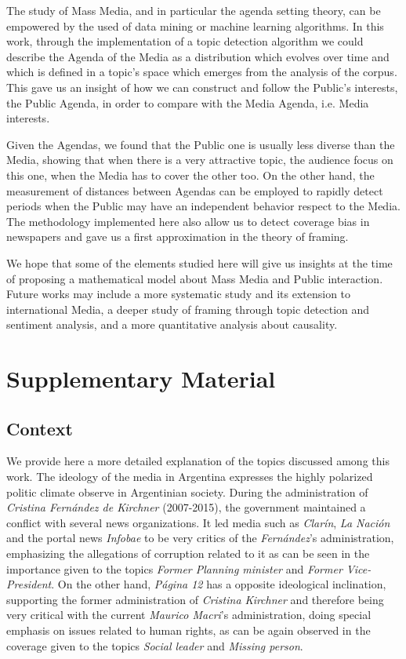 \documentclass{bmcart}
\begin{document}
\par The study of Mass Media, and in particular the agenda setting theory, can be empowered by the used of data mining or machine learning algorithms. 
In this work, through the implementation of a topic detection algorithm we could describe the Agenda of the Media as a distribution which evolves over time and which is defined in a topic's space which emerges from the analysis of the corpus.
This gave us an insight of how we can construct and follow the Public's interests, the Public Agenda, in order to compare with the Media Agenda, i.e. Media interests. 
\par Given the Agendas, we found that the Public one is usually less diverse than the Media, showing that when there is a very attractive topic, the audience focus on this one, when the Media has to cover the other too. 
On the other hand, the measurement of distances between Agendas can be employed to rapidly detect periods when the Public may have an independent behavior respect to the Media. The methodology implemented here also allow us to detect coverage bias in newspapers and gave us a first approximation in the theory of framing. 
\par We hope that some of the elements studied here will give us insights at the time of proposing a mathematical model about Mass Media and Public interaction. Future works may include a more systematic study and its extension to international Media, a deeper study of framing through topic detection and sentiment analysis, and a more quantitative analysis about causality.

\newpage
\section*{Supplementary Material}
\subsection*{Context}
\label{sec:Context}

\par We provide here a more detailed explanation of the topics discussed among this work.
The ideology of the media in Argentina expresses the highly polarized politic climate observe in Argentinian society.
During the administration of \emph{Cristina Fern\'andez de Kirchner} (2007-2015), the government maintained a conflict with several news organizations.
It led media such as \emph{Clar\'in}, \emph{La Naci\'on} and the portal news \emph{Infobae} to be very critics of the \emph{Fern\'andez}'s administration, emphasizing the allegations of corruption related to it as can be seen in the importance given to the topics \emph{Former Planning minister} and \emph{Former Vice-President}.
On the other hand, \emph{P\'agina 12} has a opposite ideological inclination, supporting the former administration of \emph{Cristina Kirchner} and therefore being very critical with the current \emph{Maurico Macri}'s administration, doing special emphasis on issues related to human rights, as can be again observed in the coverage given to the topics \emph{Social leader} and \emph{Missing person}.
\end{document}

